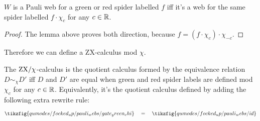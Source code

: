 \begin{proposition}\label{prop:web_invariant_mod_chi}
    $W$ is a Pauli web for a green or red spider labelled $f$ iff it's a web for the same spider labelled $f \cdot \chi_c$ for any $c \in \mathbb{R}$.
    \begin{proof}
        The lemma above proves both direction, because $f = (f \cdot \chi_c) \cdot \chi_{-c}$.
    \end{proof}
\end{proposition}

Therefore we can define a ZX-calculus mod $\chi$.

\begin{definition}\label{defn:zx_mod_chi}
    The $\text{ZX}/\chi$-calculus is the quotient calculus formed by the equivalence relation $D \sim_\chi D'$ iff $D$ and $D'$ are equal when green and red spider labels are defined mod $\chi_c$ for any $c \in \mathbb{R}$.
    Equivalently, it's the quotient calculus defined by adding the following extra rewrite rule:
    \begin{equation}
        \tikzfig{qumodes/focked_up/pauli_webs/gate_green_chi}
        \quad = \quad
        \tikzfig{qumodes/focked_up/pauli_webs/id}
    \end{equation}
\end{definition}
